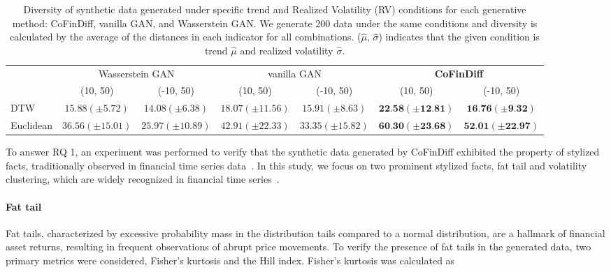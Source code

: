 \documentclass{article}
\begin{document}
{
\begin{table}[t]
\centering
\caption{Diversity of synthetic data generated under specific trend and Realized Volatility (RV) conditions for each generative method: CoFinDiff, vanilla GAN, and Wasserstein GAN. We generate 200 data under the same conditions and diversity is calculated by the average of the distances in each indicator for all combinations.
($\hat{\mu}$, $\hat{\sigma}$) indicates that the given condition is trend $\hat{\mu}$ and realized volatility $\hat{\sigma}$.
}
\begin{tabular}{l|cc|cc|cc}
\toprule
& \multicolumn{2}{c|}{Wasserstein GAN} & \multicolumn{2}{c|}{vanilla GAN} & \multicolumn{2}{c}{\textbf{CoFinDiff}} \\
& (10, 50) & (-10, 50) & (10, 50) & (-10, 50) & (10, 50) & (-10, 50) \\
\midrule
DTW & $15.88(\pm5.72)$ & $14.08(\pm6.38)$ & $18.07(\pm11.56)$ & $15.91(\pm8.63)$ & $\textbf{22.58}(\pm\textbf{12.81})$ & $\textbf{16.76}(\pm\textbf{9.32})$ \\
Euclidean & $36.56(\pm15.01)$ & $25.97(\pm10.89)$ & $42.91(\pm22.33)$ & $33.35(\pm15.82)$ & $\textbf{60.30}(\pm\textbf{23.68})$ & $\textbf{52.01}(\pm\textbf{22.97})$ \\
\bottomrule
\end{tabular}
\label{Tab:diversity}
\end{table}
}

To answer RQ 1, an experiment was performed to verify that the synthetic data generated by CoFinDiff exhibited the property of stylized facts, traditionally observed in financial time series data~\cite{stylized_facts}.
In this study, we focus on two prominent stylized facts, fat tail and volatility clustering, which are widely recognized in financial time series~\cite{volatility_clustering}.


\paragraph{Fat tail}
Fat tails, characterized by excessive probability mass in the distribution tails compared to a normal distribution, are a hallmark of financial asset returns, resulting in frequent observations of abrupt price movements. To verify the presence of fat tails in the generated data, two primary metrics were considered, Fisher's kurtosis and the Hill index. Fisher's kurtosis was calculated as 
\end{document}
